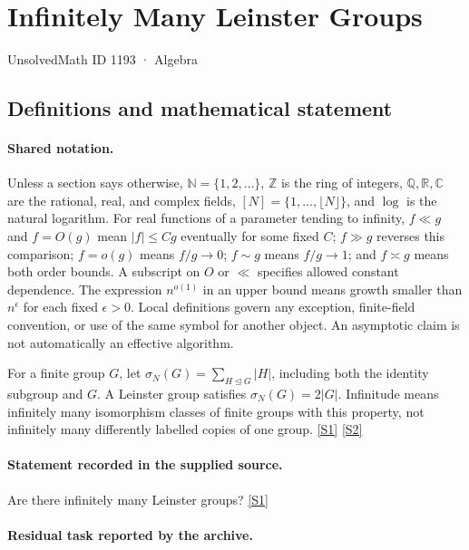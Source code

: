 \documentclass[11pt,a4paper]{article}
\newcommand{\N}{\mathbb{N}}
\newcommand{\Z}{\mathbb{Z}}
\newcommand{\Q}{\mathbb{Q}}
\newcommand{\R}{\mathbb{R}}
\newcommand{\C}{\mathbb{C}}
\newcommand{\sref}[2]{\hyperlink{source:#1:#2}{[S#2]}}
\begin{document}

\setcounter{section}{1192}

\section{Infinitely Many Leinster Groups}\label{1193}

{\small\sffamily UnsolvedMath ID 1193 · Algebra}

\subsection{Definitions and mathematical statement}

\paragraph{Shared notation.}Unless a section says otherwise, $\N=\{1,2,\ldots\}$,
$\Z$ is the ring of integers, $\Q,\R,\C$ are the rational, real, and complex
fields, $[N]=\{1,\ldots,\lfloor N\rfloor\}$, and $\log$ is the natural
logarithm. For real functions of a parameter tending to infinity,
$f\ll g$ and $f=O(g)$ mean $|f|\leq Cg$ eventually for some fixed $C$;
$f\gg g$ reverses this comparison; $f=o(g)$ means $f/g\to0$;
$f\sim g$ means $f/g\to1$; and $f\asymp g$ means both order bounds.
A subscript on $O$ or $\ll$ specifies allowed constant dependence.
The expression $n^{o(1)}$ in an upper bound means growth smaller than
$n^\epsilon$ for each fixed $\epsilon>0$. Local definitions govern any
exception, finite-field convention, or use of the same symbol for another
object. An asymptotic claim is not automatically an effective algorithm.



For a finite group $G$, let $\sigma_N(G)=\sum_{H\trianglelefteq G}|H|$, including both the identity subgroup and $G$. A Leinster group satisfies $\sigma_N(G)=2|G|$. Infinitude means infinitely many isomorphism classes of finite groups with this property, not infinitely many differently labelled copies of one group. \sref{1193}{1} \sref{1193}{2}

\paragraph{Statement recorded in the supplied source.}
Are there infinitely many Leinster groups? \sref{1193}{1}

\paragraph{Residual task reported by the archive.}
\end{document}

